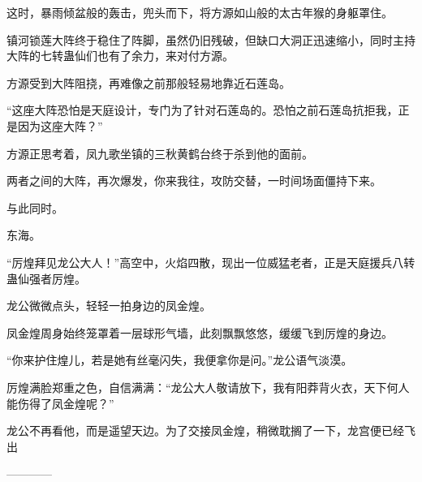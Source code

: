 \begin{this_body}
这时，暴雨倾盆般的轰击，兜头而下，将方源如山般的太古年猴的身躯罩住。

镇河锁莲大阵终于稳住了阵脚，虽然仍旧残破，但缺口大洞正迅速缩小，同时主持大阵的七转蛊仙们也有了余力，来对付方源。

方源受到大阵阻挠，再难像之前那般轻易地靠近石莲岛。

“这座大阵恐怕是天庭设计，专门为了针对石莲岛的。恐怕之前石莲岛抗拒我，正是因为这座大阵？”

方源正思考着，凤九歌坐镇的三秋黄鹤台终于杀到他的面前。

两者之间的大阵，再次爆发，你来我往，攻防交替，一时间场面僵持下来。

与此同时。

东海。

“厉煌拜见龙公大人！”高空中，火焰四散，现出一位威猛老者，正是天庭援兵八转蛊仙强者厉煌。

龙公微微点头，轻轻一拍身边的凤金煌。

凤金煌周身始终笼罩着一层球形气墙，此刻飘飘悠悠，缓缓飞到厉煌的身边。

“你来护住煌儿，若是她有丝毫闪失，我便拿你是问。”龙公语气淡漠。

厉煌满脸郑重之色，自信满满：“龙公大人敬请放下，我有阳莽背火衣，天下何人能伤得了凤金煌呢？”

龙公不再看他，而是遥望天边。为了交接凤金煌，稍微耽搁了一下，龙宫便已经飞出

------------

\end{this_body}


